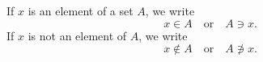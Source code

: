 If $x$ is an element of a set $A$, we write
$$x \in A \quad \text{or} \quad A \ni x.$$
If $x$ is not an element of $A$, we write
$$x \notin A \quad \text{or} \quad A \not\ni x.$$

